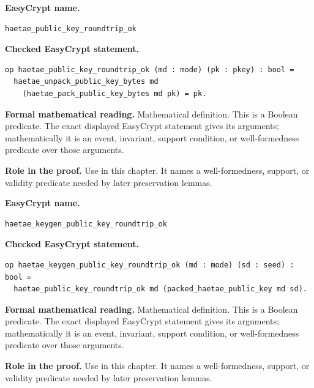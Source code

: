 \begin{formaldefinition}
\noindent\textbf{EasyCrypt name.}
\begin{lstlisting}[language=EasyCrypt,basicstyle=\ttfamily\scriptsize]
haetae_public_key_roundtrip_ok
\end{lstlisting}
\noindent\textbf{Checked EasyCrypt statement.}
\begin{lstlisting}[language=EasyCrypt,basicstyle=\ttfamily\scriptsize]
op haetae_public_key_roundtrip_ok (md : mode) (pk : pkey) : bool =
  haetae_unpack_public_key_bytes md
    (haetae_pack_public_key_bytes md pk) = pk.
\end{lstlisting}
\noindent\textbf{Formal mathematical reading.}
Mathematical definition. This is a Boolean predicate.  The exact displayed EasyCrypt statement gives its arguments; mathematically it is an event, invariant, support condition, or well-formedness predicate over those arguments.

\noindent\textbf{Role in the proof.}
Use in this chapter. It names a well-formedness, support, or validity predicate needed by later preservation lemmas.

\end{formaldefinition}

\begin{formaldefinition}
\noindent\textbf{EasyCrypt name.}
\begin{lstlisting}[language=EasyCrypt,basicstyle=\ttfamily\scriptsize]
haetae_keygen_public_key_roundtrip_ok
\end{lstlisting}
\noindent\textbf{Checked EasyCrypt statement.}
\begin{lstlisting}[language=EasyCrypt,basicstyle=\ttfamily\scriptsize]
op haetae_keygen_public_key_roundtrip_ok (md : mode) (sd : seed) : bool =
  haetae_public_key_roundtrip_ok md (packed_haetae_public_key md sd).
\end{lstlisting}
\noindent\textbf{Formal mathematical reading.}
Mathematical definition. This is a Boolean predicate.  The exact displayed EasyCrypt statement gives its arguments; mathematically it is an event, invariant, support condition, or well-formedness predicate over those arguments.

\noindent\textbf{Role in the proof.}
Use in this chapter. It names a well-formedness, support, or validity predicate needed by later preservation lemmas.

\end{formaldefinition}

